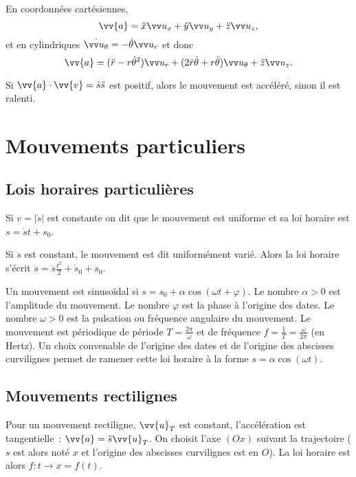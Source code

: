 En coordonnées cartésiennes,
\begin{equation}%
  \vv{a} = \ddot{x}\ux+\ddot{y}\uy+\ddot{z}\uz,%
\end{equation}%
et en cylindriques \(\dot{\utheta}=-\dot{\theta}\ur\) et donc
\begin{equation}%
  \vv{a}=(\ddot{r}-r\dot{\theta}^2)\ur+(2\dot{r}\dot{\theta}
  +r\ddot{\theta})\utheta+\ddot{z}\uz.%
\end{equation}%

Si \(\vv{a}\cdot\vv{v}=\dot{s}\ddot{s}\) est positif, alors le mouvement est 
accéléré, sinon il est ralenti.

\section{Mouvements particuliers}%
\label{chap1-sec:mvtparticuliers}%

\subsection{Lois horaires particulières}%
\label{chap1-sec:loishorairespart}%

Si \(v=|\dot{s}|\) est constante on dit que le mouvement est uniforme et sa 
loi horaire est \(s=\dot{s}t+s_0\).

Si \(\ddot{s}\) est constant, le mouvement est dit uniformément varié. Alors 
la loi horaire s'écrit \(s=\ddot{s} \frac{t^2}{2}+\dot{s}_0 +s_0\).

Un mouvement est sinusoïdal si \(s=s_0+\alpha \cos(\omega t+\varphi)\). Le 
nombre \(\alpha>0\) est l'amplitude du mouvement. Le nombre \(\varphi\) est la 
phase à l'origine des dates. Le nombre \(\omega>0\) est la pulsation ou 
fréquence angulaire du mouvement. Le mouvement est périodique de période 
\(T=\frac{2\pi}{\omega}\) et de fréquence 
\(f=\frac{1}{T}=\frac{\omega}{2\pi}\) 
(en Hertz). Un choix convenable de l'origine des dates et de l'origine des 
abscisses curvilignes permet de ramener cette loi horaire à la forme \(s = 
\alpha\cos(\omega t)\).

\subsection{Mouvements rectilignes}%
\label{chap1-sec:mvtrect}%

Pour un mouvement rectiligne, \(\vv{u}_T\) est constant, l'accélération est 
tangentielle~: \(\vv{a}=\ddot{s} \vv{u}_T\). On choisit l'axe \((Ox)\) suivant 
la trajectoire (\(s\) est alors noté \(x\) et l'origine des abscisses 
curvilignes est en \(O\)). La loi horaire est alors \(f:t \rightarrow x=f(t)\).

